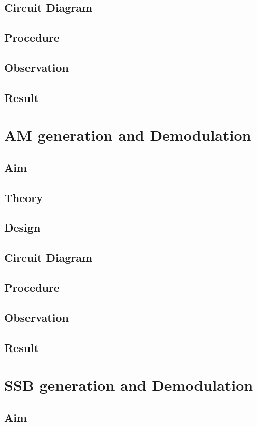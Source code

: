 \documentclass{book}
\begin{document}
\section*{Circuit Diagram}
\section*{Procedure}
\section*{Observation}
\section*{Result}

\chapter[AM generation and Demodulation]{AM generation and Demodulation}
\section*{Aim}
\section*{Theory}
\section*{Design}
\section*{Circuit Diagram}
\section*{Procedure}
\section*{Observation}
\section*{Result}
\chapter[SSB generation and Demodulation]{SSB generation and Demodulation}
\section*{Aim}
\end{document}
